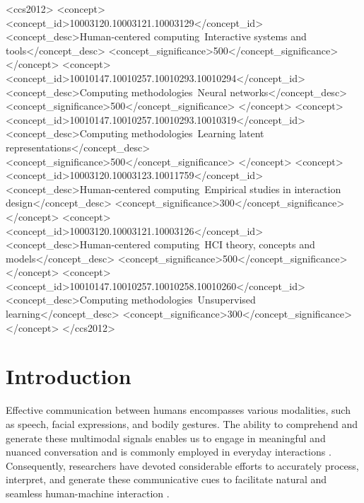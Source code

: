 \documentclass[sigconf]{acmart}
\begin{document}
\begin{CCSXML}
<ccs2012>
   <concept>
       <concept_id>10003120.10003121.10003129</concept_id>
       <concept_desc>Human-centered computing~Interactive systems and tools</concept_desc>
       <concept_significance>500</concept_significance>
       </concept>
   <concept>
       <concept_id>10010147.10010257.10010293.10010294</concept_id>
       <concept_desc>Computing methodologies~Neural networks</concept_desc>
       <concept_significance>500</concept_significance>
       </concept>
   <concept>
       <concept_id>10010147.10010257.10010293.10010319</concept_id>
       <concept_desc>Computing methodologies~Learning latent representations</concept_desc>
       <concept_significance>500</concept_significance>
       </concept>
   <concept>
       <concept_id>10003120.10003123.10011759</concept_id>
       <concept_desc>Human-centered computing~Empirical studies in interaction design</concept_desc>
       <concept_significance>300</concept_significance>
       </concept>
   <concept>
       <concept_id>10003120.10003121.10003126</concept_id>
       <concept_desc>Human-centered computing~HCI theory, concepts and models</concept_desc>
       <concept_significance>500</concept_significance>
       </concept>
   <concept>
       <concept_id>10010147.10010257.10010258.10010260</concept_id>
       <concept_desc>Computing methodologies~Unsupervised learning</concept_desc>
       <concept_significance>300</concept_significance>
       </concept>
 </ccs2012>
\end{CCSXML}





\maketitle



\section{Introduction}
Effective communication between humans encompasses various modalities, such as speech, facial expressions, and bodily gestures. The ability to comprehend and generate these multimodal signals enables us to engage in meaningful and nuanced conversation and is commonly employed in everyday interactions \cite{cassell1999speech,wagner2014gesture}. Consequently, researchers have devoted considerable efforts to accurately process, interpret, and generate these communicative cues to facilitate natural and seamless human-machine interaction \cite{koppCommonFrameworkMultimodal2006a}.
\end{document}
